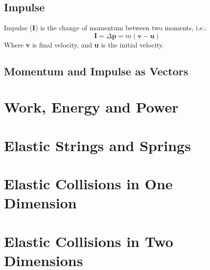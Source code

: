     \subsection{Impulse}
        Impulse (\textbf{I}) is the change of \gls{momentum} between two moments, i.e.:
        \begin{equation}
            \textbf{I}=\Delta\textbf{p}=m(\textbf{v}-\textbf{u})
        \end{equation}
        Where \textbf{v} is final \gls{velocity}, and \textbf{u} is the initial \gls{velocity}.

    \subsection{Momentum and Impulse as Vectors}

    \newpage

\section{Work, Energy and Power} \label{work_energy_and_power}
\newpage
\section{Elastic Strings and Springs} \label{elastic_strings_and_springs}
\newpage
\section{Elastic Collisions in One Dimension} \label{elastic_collisions_in_one_dimension}
\newpage
\section{Elastic Collisions in Two Dimensions} \label{elastic_collisions_in_two_dimensions}
\newpage